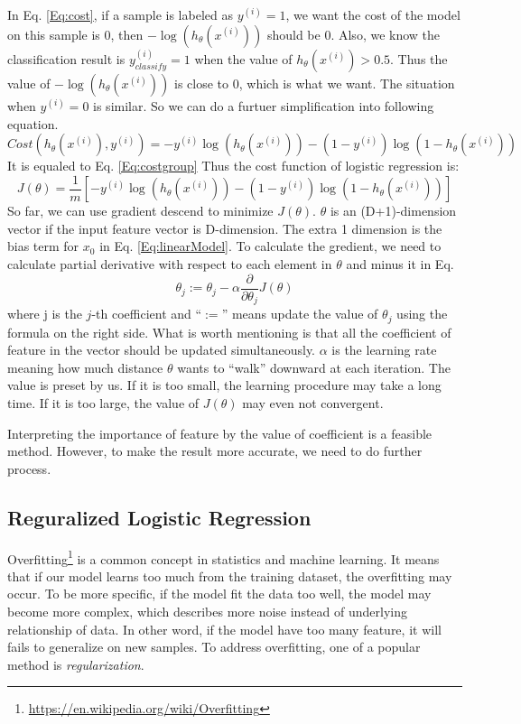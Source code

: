 In Eq. \ref{Eq:cost}, if a sample is labeled as $y^{(i)}=1$, we want the cost of the model on this sample is 0, then $-\log{(h_{\theta}(x^{(i)}))}$ should be 0. Also, we know the classification result is $y_{classify}^{(i)}=1$ when the value of $h_{\theta}(x^{(i)}) > 0.5$. Thus the value of $-\log{(h_{\theta}(x^{(i)}))}$ is close to 0, which is what we want. The situation when $y^{(i)}=0$ is similar. So we can do a furtuer simplification into following equation. 
\begin{equation} \label{Eq:cost}
Cost(h_{\theta}(x^{(i)}),y^{(i)})=-y^{(i)}\log{(h_{\theta}(x^{(i)}))}-(1-y^{(i)})\log(1-h_{\theta}(x^{(i)}))
\end{equation}
It is equaled to Eq. \ref{Eq:costgroup}
Thus the cost function of logistic regression is:
\begin{equation} \label{Eq:newCostFunction}
J(\theta)=\frac{1}{m}[-y^{(i)}\log{(h_{\theta}(x^{(i)}))}-(1-y^{(i)})\log(1-h_{\theta}(x^{(i)}))]
\end{equation}
So far, we can use gradient descend to minimize $J(\theta)$. $\theta$ is an (D+1)-dimension vector if the input feature vector is D-dimension. The extra 1 dimension is the bias term for $x_0$ in Eq. \ref{Eq:linearModel}. To calculate the gredient, we need to calculate partial derivative with respect to each element in $\theta$ and minus it in Eq.
\begin{equation}
\label{Eq:thetaUpdate}
\theta_j := \theta_j - \alpha \frac{\partial}{\partial\theta_j}J(\theta)
\end{equation}
where j is the $j$-th coefficient and ``$:=$'' means update the value of $\theta_j$ using the formula on the right side. What is worth mentioning is that all the coefficient of feature in the vector should be updated simultaneously. $\alpha$ is the learning rate meaning how much distance $\theta$ wants to ``walk'' downward at each iteration. The value is preset by us. If it is too small, the learning procedure may take a long time. If it is too large, the value of $J(\theta)$ may even not convergent.

Interpreting the importance of feature by the value of coefficient is a feasible method. However, to make the result more accurate, we need to do further process.
\subsection{Reguralized Logistic Regression}
Overfitting\footnote{\url{https://en.wikipedia.org/wiki/Overfitting}} is a common concept in statistics and machine learning. It means that if our model learns too much from the training dataset, the overfitting may occur. To be more specific, if the model fit the data too well, the model may become more complex, which describes more noise instead of underlying relationship of data. In other word, if the model have too many feature, it will fails to generalize on new samples. To address overfitting, one of a popular method is \textit{regularization}.

